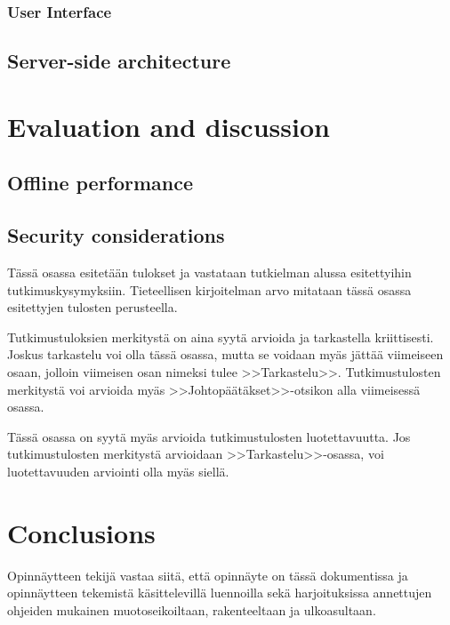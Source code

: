 \documentclass[english,12pt,a4paper,pdftex]{article}
\begin{document}
\subsubsection{User Interface}

\subsection{Server-side architecture}

\clearpage

\clearpage

\section{Evaluation and discussion}
\subsection{Offline performance}
\subsection{Security considerations}

Tässä osassa esitetään tulokset ja vastataan tutkielman alussa
esitettyihin tutkimuskysymyksiin. Tieteellisen kirjoitelman
arvo mitataan tässä osassa esitettyjen tulosten perusteella.

Tutkimustuloksien merkitystä on aina syytä arvioida ja tarkastella
kriittisesti.  Joskus tarkastelu voi olla tässä osassa, mutta se
voidaan myäs jättää viimeiseen osaan, jolloin viimeisen osan nimeksi
tulee >>Tarkastelu>>. Tutkimustulosten merkitystä voi arvioida myäs
>>Johtopäätäkset>>-otsikon alla viimeisessä osassa.

Tässä osassa on syytä myäs arvioida tutkimustulosten luotettavuutta.
Jos tutkimustulosten merkitystä arvioidaan >>Tarkastelu>>-osassa,
voi luotettavuuden arviointi olla myäs siellä.

\clearpage

\section{Conclusions}

Opinnäytteen tekijä vastaa siitä, että opinnäyte on tässä dokumentissa
ja opinnäytteen tekemistä käsittelevillä luennoilla sekä
harjoituksissa annettujen ohjeiden mukainen muotoseikoiltaan,
rakenteeltaan ja ulkoasultaan.
\end{document}

